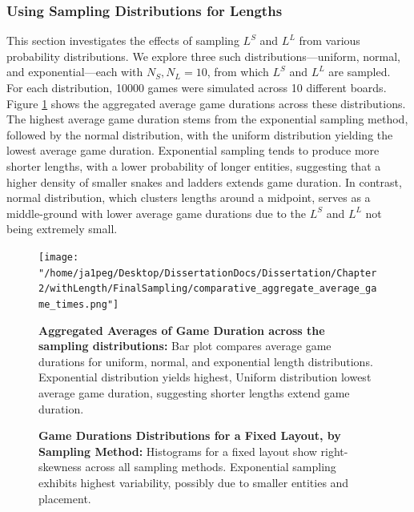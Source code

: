 \subsubsection{Using Sampling Distributions for Lengths}

This section investigates the effects of sampling $L^S$ and $L^L$ from various probability distributions. We explore three such distributions—uniform, normal, and exponential—each with $N_S, N_L = 10$, from which $L^S$ and $L^L$ are sampled. For each distribution, 10000 games were simulated across 10 different boards. Figure \ref{fig:sampling_dist_avg_times} shows the aggregated average game durations across these distributions. The highest average game duration stems from the exponential sampling method, followed by the normal distribution, with the uniform distribution yielding the lowest average game duration. Exponential sampling tends to produce more shorter lengths, with a lower probability of longer entities, suggesting that a higher density of smaller snakes and ladders extends game duration. In contrast, normal distribution, which clusters lengths around a midpoint, serves as a middle-ground with lower average game durations due to the $L^S$ and $L^L$ not being extremely small.

\begin{figure}[ht]
	\centering
	\texttt{[image: "/home/ja1peg/Desktop/DissertationDocs/Dissertation/Chapter 2/withLength/FinalSampling/comparative\_aggregate\_average\_game\_times.png"]} 
	\caption{\textbf{Aggregated Averages of Game Duration across the sampling distributions:} Bar plot compares average game durations for uniform, normal, and exponential length distributions. Exponential distribution yields highest, Uniform distribution lowest average game duration, suggesting shorter lengths extend game duration.}
	\label{fig:sampling_dist_avg_times}
\end{figure}

\begin{figure}[ht]
	\centering
	\linebreak
	\caption{\textbf{Game Durations Distributions for a Fixed Layout, by Sampling Method:} Histograms for a fixed layout show right-skewness across all sampling methods. Exponential sampling exhibits highest variability, possibly due to smaller entities and placement.}
	\label{fig:sampling_dist_layout_dists}
\end{figure}

